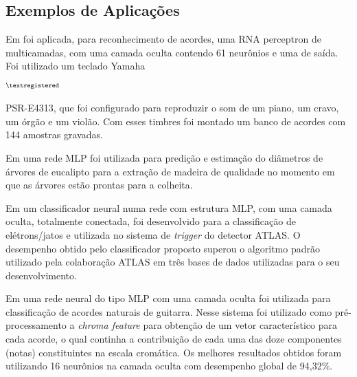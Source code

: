 \subsection{Exemplos de Aplicações}


Em  foi aplicada, para reconhecimento de acordes, uma RNA perceptron de multicamadas, com uma camada oculta contendo 61 neurônios e uma de saída. Foi utilizado um teclado Yamaha\begin{footnotesize}$^{\textregistered}$\end{footnotesize} PSR-E4313, que foi configurado para reproduzir o som de um piano, um cravo, um órgão e um violão.
Com esses timbres foi montado um banco de acordes com 144 amostras gravadas.

Em  uma rede MLP foi utilizada para predição e estimação do diâmetros de árvores de eucalipto para a extração de madeira de qualidade no momento em que as árvores estão prontas para a colheita.

Em  um classificador neural numa rede com estrutura MLP, com uma camada oculta, totalmente conectada, foi desenvolvido para a classificação de elétrons/jatos e utilizada no sistema de \textit{trigger} do detector ATLAS. O desempenho obtido pelo classificador proposto superou o algoritmo padrão utilizado pela colaboração ATLAS em três bases de dados utilizadas para o seu desenvolvimento.

Em  uma rede neural do tipo MLP com uma camada oculta foi utilizada para classificação de acordes naturais de guitarra. Nesse sistema foi utilizado como pré-processamento a \textit{chroma feature} para obtenção de um vetor característico para cada acorde, o qual continha a contribuição de cada uma das doze componentes (notas) constituintes na escala cromática. Os melhores resultados obtidos foram utilizando 16 neurônios na camada oculta com desempenho global de 94,32\%.

